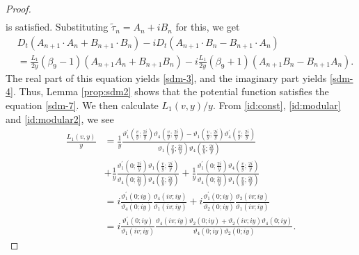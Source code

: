 \documentclass[10pt,leqno]{amsart}
\numberwithin{equation}{section}
\begin{document}
\begin{proof}
\begin{equation}
\begin{split}
\end{split}
\end{equation}
 is satisfied. Substituting $\widetilde{\tau}_{n}=A_{n}+iB_{n}$ for this, we get
\begin{equation}\label{sdm-5-4}
\begin{split}
&D_{t}\left(A_{n+1}\cdot A_{n}+B_{n+1}\cdot B_{n}\right)-iD_{t}\left(A_{n+1}\cdot B_{n}-B_{n+1}\cdot A_{n}\right)\\
&=\frac{L_{1}}{2y}\left(\beta_{9}-1\right)\left(A_{n+1}A_{n}+B_{n+1}B_{n}\right)-i\frac{L_{1}}{2y}\left(\beta_{9}+1\right)\left(A_{n+1}B_{n}-B_{n+1}A_{n}\right).
\end{split}
\end{equation}
The real part of this equation yields \eqref{sdm-3}, and the imaginary part yields \eqref{sdm-4}.
Thus, Lemma \ref{prop:sdm2} shows that the potential function satisfies the equation \eqref{sdm-7}.
We then calculate $L_{1}(v,y)/y$.
From \eqref{id:const}, \eqref{id:modular} and \eqref{id:modular2}, we see
\begin{equation}\label{eqn:L1-1}
\begin{split}
\frac{L_{1}(v,y)}{y}&=\frac{1}{y}\frac{\vartheta_{1}^{'}\left(\frac{v}{y}; \frac{2i}{y}\right)\vartheta_{4}\left(\frac{v}{y}; \frac{2i}{y}\right)-\vartheta_{1}\left(\frac{v}{y}; \frac{2i}{y}\right)\vartheta_{4}^{'}\left(\frac{v}{y}; \frac{2i}{y}\right)}{\vartheta_{1}\left(\frac{v}{y}; \frac{2i}{y}\right)\vartheta_{4}\left(\frac{v}{y}; \frac{2i}{y}\right)}\\
&+\frac{1}{y}\frac{\vartheta_{1}^{'}\left(0; \frac{2i}{y}\right)\vartheta_{1}\left(\frac{v}{y}; \frac{2i}{y}\right)}{\vartheta_{4}\left(0; \frac{2i}{y}\right)\vartheta_{4}\left(\frac{v}{y}; \frac{2i}{y}\right)}+\frac{1}{y}\frac{\vartheta_{1}^{'}\left(0; \frac{2i}{y}\right)\vartheta_{4}\left(\frac{v}{y}; \frac{2i}{y}\right)}{\vartheta_{4}\left(0; \frac{2i}{y}\right)\vartheta_{1}\left(\frac{v}{y}; \frac{2i}{y}\right)}\\
&=i\frac{\vartheta_{1}^{'}\left(0; iy\right)}{\vartheta_{4}\left(0; iy\right)}\frac{\vartheta_{4}\left(iv; iy\right)}{\vartheta_{1}\left(iv; iy\right)}+i\frac{\vartheta_{1}^{'}\left(0; iy\right)}{\vartheta_{2}\left(0; iy\right)}\frac{\vartheta_{2}\left(iv; iy\right)}{\vartheta_{1}\left(iv; iy\right)}\\
&=i\frac{\vartheta_{1}^{'}\left(0; iy\right)}{\vartheta_{1}\left(iv; iy\right)}\frac{\vartheta_{4}\left(iv; iy\right)\vartheta_{2}\left(0; iy\right)+\vartheta_{2}\left(iv; iy\right)\vartheta_{4}\left(0; iy\right)}{\vartheta_{4}\left(0; iy\right)\vartheta_{2}\left(0; iy\right)}.

\end{split}
\end{equation}
\end{proof}
\end{document}
